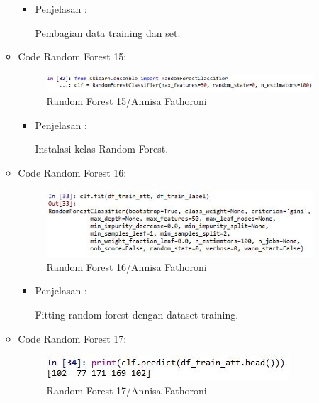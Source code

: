 \begin{enumerate}
\begin{itemize}
\begin{itemize}
\item Penjelasan :

Pembagian data training dan set.

\end{itemize}
\item Code Random Forest 15:

\begin{figure}[ht]
\centering
\includegraphics[scale=0.6]{figures/Chapter3AnnisaFathoroni24.jpg}
\caption{Random Forest 15/Annisa Fathoroni}
\label{contoh}
\end{figure}

\begin{itemize}
\item Penjelasan :

Instalasi kelas Random Forest.

\end{itemize}
\item Code Random Forest 16:

\begin{figure}[ht]
\centering
\includegraphics[scale=0.6]{figures/Chapter3AnnisaFathoroni25.jpg}
\caption{Random Forest 16/Annisa Fathoroni}
\label{contoh}
\end{figure}

\begin{itemize}
\item Penjelasan :

Fitting random forest dengan dataset training.

\end{itemize}
\item Code Random Forest 17:

\begin{figure}[ht]
\centering
\includegraphics[scale=0.6]{figures/Chapter3AnnisaFathoroni26.jpg}
\caption{Random Forest 17/Annisa Fathoroni}
\label{contoh}
\end{figure}


\end{itemize}
\end{enumerate}
